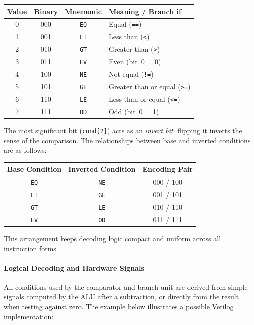 \begin{center}
\begin{tabular}{|c|c|c|l|}
\hline
\textbf{Value} & \textbf{Binary} & \textbf{Mnemonic} & \textbf{Meaning / Branch if} \\ \hline
0 & 000 & \texttt{EQ} & Equal (\texttt{==}) \\ \hline
1 & 001 & \texttt{LT} & Less than (\texttt{<}) \\ \hline
2 & 010 & \texttt{GT} & Greater than (\texttt{>}) \\ \hline
3 & 011 & \texttt{EV} & Even (bit~0 = 0) \\ \hline
4 & 100 & \texttt{NE} & Not equal (\texttt{!=}) \\ \hline
5 & 101 & \texttt{GE} & Greater than or equal (\texttt{>=}) \\ \hline
6 & 110 & \texttt{LE} & Less than or equal (\texttt{<=}) \\ \hline
7 & 111 & \texttt{OD} & Odd (bit~0 = 1) \\ \hline
\end{tabular}
\end{center}

The most significant bit (\texttt{cond[2]}) acts as an \emph{invert bit}: flipping it inverts the sense of the comparison.  
The relationships between base and inverted conditions are as follows:

\begin{center}
\begin{tabular}{|c|c|c|}
\hline
\textbf{Base Condition} & \textbf{Inverted Condition} & \textbf{Encoding Pair} \\ \hline
\texttt{EQ} & \texttt{NE} & 000 / 100 \\ \hline
\texttt{LT} & \texttt{GE} & 001 / 101 \\ \hline
\texttt{GT} & \texttt{LE} & 010 / 110 \\ \hline
\texttt{EV} & \texttt{OD} & 011 / 111 \\ \hline
\end{tabular}
\end{center}

This arrangement keeps decoding logic compact and uniform across all instruction forms.

\paragraph{Logical Decoding and Hardware Signals}

All conditions used by the comparator and branch unit are derived from simple signals computed by the ALU after a subtraction, or directly from the result when testing against zero. The example below illustrates a possible Verilog implementation:

